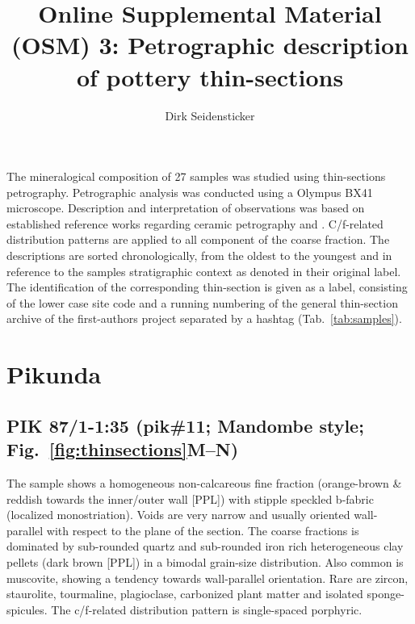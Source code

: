 \documentclass[a4paper]{article}
\title{Online Supplemental Material (OSM) 3: Petrographic description of pottery thin-sections}
\author{Dirk Seidensticker}
\begin{document}
	
\setcounter{figure}{12}

\maketitle

\noindent The mineralogical composition of 27 samples was studied using thin-sections petrography. Petrographic analysis was conducted using a Olympus BX41 microscope. Description and interpretation of observations was based on established reference works regarding ceramic petrography \citep{MacKenzie.2017,Quinn.2022} and \citet{Stoops.2021}. C/f-related distribution patterns are applied to all component of the coarse fraction. The descriptions are sorted chronologically, from the oldest to the youngest and in reference to the samples stratigraphic context as denoted in their original label. The identification of the corresponding thin-section is given as a label, consisting of the lower case site code and a running numbering of the general thin-section archive of the first-authors project separated by a hashtag (Tab.~\ref{tab:samples}).

\tableofcontents

\newpage\section{Pikunda}

\subsection{PIK 87/1-1:35 (pik\#11; Mandombe style; Fig.~\ref{fig:thinsections}M--N)}	

\begin{multicols}{2}
\noindent The sample shows a homogeneous non-calcareous fine fraction (orange-brown \& reddish towards the inner/outer wall [PPL]) with stipple speckled b-fabric (localized monostriation). Voids are very narrow and usually oriented wall-parallel with respect to the plane of the section. The coarse fractions is dominated by sub-rounded quartz and sub-rounded iron rich heterogeneous clay pellets (dark brown [PPL]) in a bimodal grain-size distribution. Also common is muscovite, showing a tendency towards wall-parallel orientation. Rare are zircon, staurolite, tourmaline, plagioclase, carbonized plant matter and isolated sponge-spicules. The c/f-related distribution pattern is single-spaced porphyric.\end{multicols}
\end{document}
